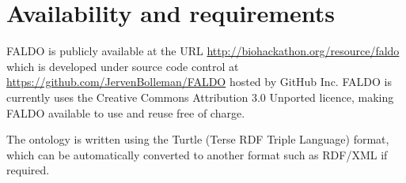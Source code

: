 \section*{Availability and requirements}
FALDO is publicly available at the URL \url{http://biohackathon.org/resource/faldo}
which is developed under source code control at
\url{https://github.com/JervenBolleman/FALDO} hosted by GitHub Inc.
FALDO is currently uses the Creative Commons Attribution 3.0 Unported licence,
making FALDO available to use and reuse free of charge.

The ontology is written using the Turtle (Terse RDF Triple Language) format,
which can be automatically converted to another format such as RDF/XML
if required.


